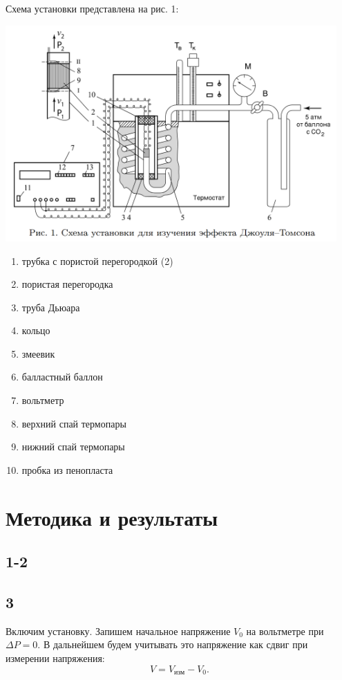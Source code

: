 \newpage
Схема установки представлена на рис. 1:
\begin{center}
\includegraphics[width=0.95\textwidth]{equip.png}
\end{center}

\begin{enumerate}
	\item трубка с пористой перегородкой (2)
	\item пористая перегородка
	\item труба Дьюара
	\item кольцо
	\item змеевик
	\item балластный баллон
	\item вольтметр
	\item верхний спай термопары
	\item нижний спай термопары
	\item пробка из пенопласта
\end{enumerate}
\newpage
\section*{Методика и результаты}

\subsection*{1-2}
\subsection*{3}
Включим установку. Запишем начальное напряжение $V_0$ на вольтметре при $\Delta P = 0$. В дальнейшем будем учитывать это напряжение как сдвиг при измерении напряжения:
$$V = V_\text{изм} - V_0.$$
